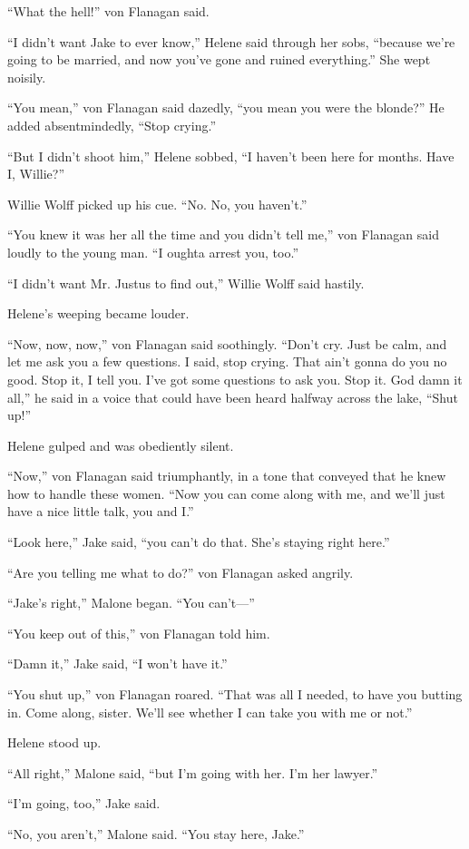 \documentclass{novel}
\begin{document}
“What the hell!” von Flanagan said.

“I didn’t want Jake to ever know,” Helene said through her sobs, “because we’re going to be married, and now you’ve gone and ruined everything.” She wept noisily.

“You mean,” von Flanagan said dazedly, “you mean you were the blonde?” He added absentmindedly, “Stop crying.”

“But I didn’t shoot him,” Helene sobbed, “I haven’t been here for months. Have I, Willie?”

Willie Wolff picked up his cue. “No. No, you haven’t.”

“You knew it was her all the time and you didn’t tell me,” von Flanagan said loudly to the young man. “I oughta arrest you, too.”

“I didn’t want Mr. Justus to find out,” Willie Wolff said hastily.

Helene’s weeping became louder.

“Now, now, now,” von Flanagan said soothingly. “Don’t cry. Just be calm, and let me ask you a few questions. I said, stop crying. That ain’t gonna do you no good. Stop it, I tell you. I’ve got some questions to ask you. Stop it. God damn it all,” he said in a voice that could have been heard halfway across the lake, “Shut up!”

Helene gulped and was obediently silent.

“Now,” von Flanagan said triumphantly, in a tone that conveyed that he knew how to handle these women. “Now you can come along with me, and we’ll just have a nice little talk, you and I.”

“Look here,” Jake said, “you can’t do that. She’s staying right here.”

“Are you telling me what to do?” von Flanagan asked angrily.

“Jake’s right,” Malone began. “You can’t—”

“You keep out of this,” von Flanagan told him.

“Damn it,” Jake said, “I won’t have it.”

“You shut up,” von Flanagan roared. “That was all I needed, to have you butting in. Come along, sister. We’ll see whether I can take you with me or not.”

Helene stood up.

“All right,” Malone said, “but I’m going with her. I’m her lawyer.”

“I’m going, too,” Jake said.

“No, you aren’t,” Malone said. “You stay here, Jake.”
\end{document}
